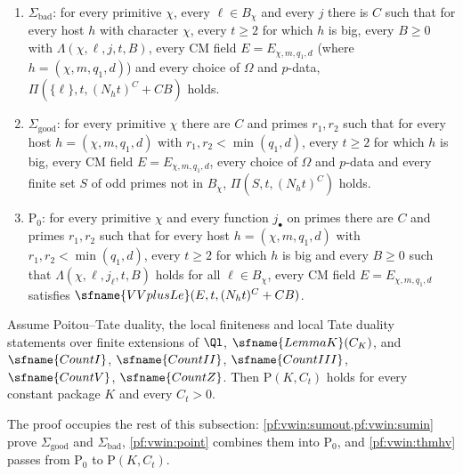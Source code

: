 \begin{definition}\label{pf:vwin:sumdefs}
\begin{enumerate}[label=(\alph*)]
\item $\Sigma_{\mathrm{bad}}$: for every primitive $\chi$, every $\ell\in B_\chi$ and every $j$ there is $C$ such that for every host
$h$ with character $\chi$, every $t\ge2$ for which $h$ is big, every $B\ge0$ with $\Lambda(\chi,\ell,j,t,B)$, every CM field
$E=E_{\chi,m,q_1,d}$ (where $h=(\chi,m,q_1,d)$) and every choice of $\Omega$ and $p$-data, $\Pi(\{\ell\},t,(N_ht)^C+CB)$ holds.
\item $\Sigma_{\mathrm{good}}$: for every primitive $\chi$ there are $C$ and primes $r_1,r_2$ such that for every host
$h=(\chi,m,q_1,d)$ with $r_1,r_2<\min(q_1,d)$, every $t\ge2$ for which $h$ is big, every CM field $E=E_{\chi,m,q_1,d}$, every
choice of $\Omega$ and $p$-data and every finite set $S$ of odd primes not in $B_\chi$, $\Pi(S,t,(N_ht)^C)$ holds.
\item $\mathrm{P}_0$: for every primitive $\chi$ and every function $j_\bullet$ on primes there are $C$ and primes $r_1,r_2$ such
that for every host $h=(\chi,m,q_1,d)$ with $r_1,r_2<\min(q_1,d)$, every $t\ge2$ for which $h$ is big and every $B\ge0$ such
that $\Lambda(\chi,\ell,j_\ell,t,B)$ holds for all $\ell\in B_\chi$, every CM field $E=E_{\chi,m,q_1,d}$ satisfies
$\sfname{VVplusLe}(E,t,(N_ht)^C+CB)$.
\end{enumerate}
\end{definition}

\begin{theorem}\label{pf:vwin:hv}
Assume Poitou--Tate duality, the local finiteness and local Tate duality statements over finite extensions of $\Ql$,
$\sfname{LemmaK}(C_K)$, and $\sfname{CountI}$, $\sfname{CountII}$, $\sfname{CountIII}$, $\sfname{CountV}$,
$\sfname{CountZ}$. Then $\mathrm{P}(K,C_t)$ holds for every constant package $K$ and every $C_t>0$.
\end{theorem}

The proof occupies the rest of this subsection: \cref{pf:vwin:sumout,pf:vwin:sumin} prove $\Sigma_{\mathrm{good}}$ and
$\Sigma_{\mathrm{bad}}$, \cref{pf:vwin:point} combines them into $\mathrm{P}_0$, and \cref{pf:vwin:thmhv} passes from
$\mathrm{P}_0$ to $\mathrm{P}(K,C_t)$.

